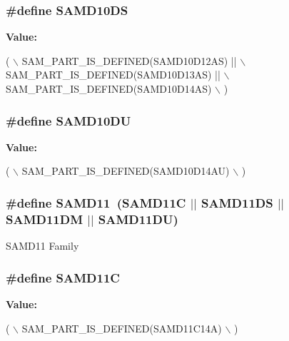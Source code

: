 \subsubsection[{S\+A\+M\+D10\+D\+S}]{\setlength{\rightskip}{0pt plus 5cm}\#define S\+A\+M\+D10\+D\+S}\label{group__sam__part__macros__group_gaad8cc1805b7c030a384ba343b1fc475f}
{\bfseries Value\+:}
\begin{DoxyCode}
( \(\backslash\)
        SAM\_PART\_IS\_DEFINED(SAMD10D12AS) || \(\backslash\)
        SAM\_PART\_IS\_DEFINED(SAMD10D13AS) || \(\backslash\)
        SAM\_PART\_IS\_DEFINED(SAMD10D14AS) \(\backslash\)
    )
\end{DoxyCode}
\hypertarget{group__sam__part__macros__group_ga697aef1095ce9ad2da295844d802cd1a}{}
\subsubsection[{S\+A\+M\+D10\+D\+U}]{\setlength{\rightskip}{0pt plus 5cm}\#define S\+A\+M\+D10\+D\+U}\label{group__sam__part__macros__group_ga697aef1095ce9ad2da295844d802cd1a}
{\bfseries Value\+:}
\begin{DoxyCode}
( \(\backslash\)
        SAM\_PART\_IS\_DEFINED(SAMD10D14AU) \(\backslash\)
    )
\end{DoxyCode}
\hypertarget{group__sam__part__macros__group_ga9e5edb5637174377186d92141e7f60d9}{}
\subsubsection[{S\+A\+M\+D11}]{\setlength{\rightskip}{0pt plus 5cm}\#define S\+A\+M\+D11~(S\+A\+M\+D11\+C $\vert$$\vert$ S\+A\+M\+D11\+D\+S $\vert$$\vert$ S\+A\+M\+D11\+D\+M $\vert$$\vert$ S\+A\+M\+D11\+D\+U)}\label{group__sam__part__macros__group_ga9e5edb5637174377186d92141e7f60d9}
S\+A\+M\+D11 Family \hypertarget{group__sam__part__macros__group_ga04267f2c27b0e5c265d7cf75e41728b5}{}
\subsubsection[{S\+A\+M\+D11\+C}]{\setlength{\rightskip}{0pt plus 5cm}\#define S\+A\+M\+D11\+C}\label{group__sam__part__macros__group_ga04267f2c27b0e5c265d7cf75e41728b5}
{\bfseries Value\+:}
\begin{DoxyCode}
( \(\backslash\)
        SAM\_PART\_IS\_DEFINED(SAMD11C14A) \(\backslash\)
    )
\end{DoxyCode}
\hypertarget{group__sam__part__macros__group_gaa3d39f43fd1dfb13a8e3769dadd3a3b2}{}
